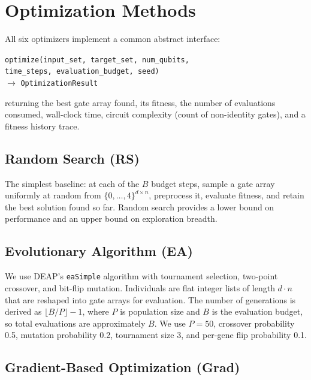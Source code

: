 \documentclass[twocolumn,11pt]{article}
\begin{document}
\section{Optimization Methods}\label{sec:methods}

All six optimizers implement a common abstract interface:
\begin{center}
\texttt{optimize(input\_set, target\_set, num\_qubits,}\\
\texttt{time\_steps, evaluation\_budget, seed)}\\
$\longrightarrow$ \texttt{OptimizationResult}
\end{center}
returning the best gate array found, its fitness, the number of evaluations
consumed, wall-clock time, circuit complexity (count of non-identity gates), and
a fitness history trace.

\subsection{Random Search (RS)}

The simplest baseline: at each of the $B$ budget steps, sample a gate array
uniformly at random from $\{0,\ldots,4\}^{d \times n}$, preprocess it, evaluate
fitness, and retain the best solution found so far.  Random search provides a
lower bound on performance and an upper bound on exploration breadth.

\subsection{Evolutionary Algorithm (EA)}

We use DEAP's \texttt{eaSimple} algorithm with tournament selection, two-point
crossover, and bit-flip mutation.  Individuals are flat integer lists of length
$d \cdot n$ that are reshaped into gate arrays for evaluation.  The number of
generations is derived as $\lfloor B / P \rfloor - 1$, where $P$ is population
size and $B$ is the evaluation budget, so total evaluations are approximately
$B$.  We use $P{=}50$, crossover probability 0.5, mutation probability 0.2,
tournament size 3, and per-gene flip probability 0.1.

\subsection{Gradient-Based Optimization (Grad)}
\end{document}
